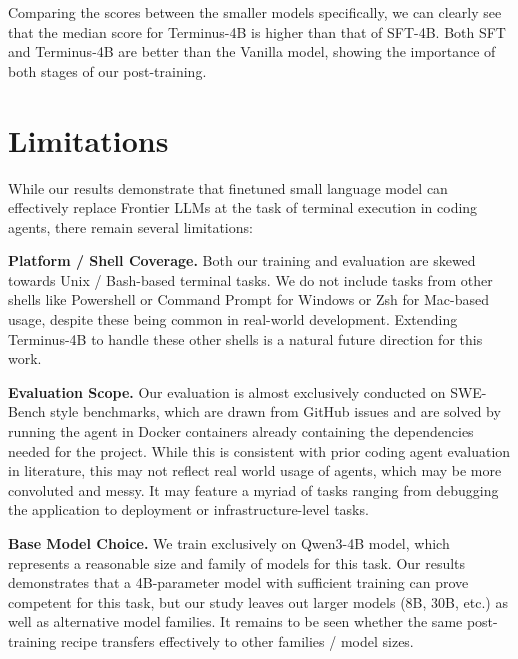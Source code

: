 \documentclass[sigconf,review]{acmart}
\begin{document}
Comparing the scores between the smaller models specifically, we can clearly see that the median score for Terminus-4B is higher than that of SFT-4B. Both SFT and Terminus-4B are better than the Vanilla model, showing the importance of both stages of our post-training.

\section{Limitations}
While our results demonstrate that finetuned small language model can effectively replace Frontier LLMs at the task of terminal execution in coding agents, there remain several limitations:

\textbf{Platform / Shell Coverage.}
Both our training and evaluation are skewed towards Unix / Bash-based terminal tasks. We do not include tasks from other shells like Powershell or Command Prompt for Windows or Zsh for Mac-based usage, despite these being common in real-world development. Extending Terminus-4B to handle these other shells is a natural future direction for this work.

\textbf{Evaluation Scope.}
Our evaluation is almost exclusively conducted on SWE-Bench style benchmarks, which are drawn from GitHub issues and are solved by running the agent in Docker containers already containing the dependencies needed for the project. While this is consistent with prior coding agent evaluation in literature, this may not reflect real world usage of agents, which may be more convoluted and messy. It may feature a myriad of tasks ranging from debugging the application to deployment or infrastructure-level tasks.

\textbf{Base Model Choice.}
We train exclusively on Qwen3-4B model, which represents a reasonable size and family of models for this task. Our results demonstrates that a 4B-parameter model with sufficient training can prove competent for this task, but our study leaves out larger models (8B, 30B, etc.) as well as alternative model families. It remains to be seen whether the same post-training recipe transfers effectively to other families / model sizes.
\end{document}

